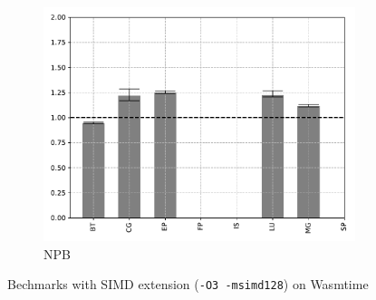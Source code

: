 \begin{figure}
\begin{subfigure}[t]{.45\textwidth}
        \includegraphics[width=\textwidth]
        {Images/6.1.RQ1/npb-wasmtime-simd.pdf}
        \caption{NPB}
    \end{subfigure}
    \caption{Bechmarks with SIMD extension (\texttt{-O3 -msimd128}) on Wasmtime}
\end{figure}

